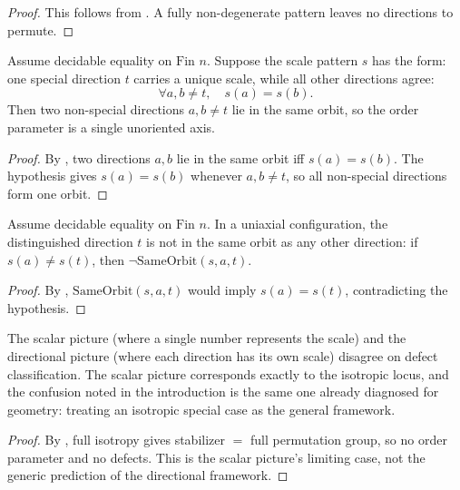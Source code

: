 \begin{proof}
This follows from . A fully non-degenerate pattern leaves no directions to permute.
\end{proof}

\begin{theorem}
Assume decidable equality on $\text{Fin } n$. Suppose the scale pattern $s$ has the form: one special direction $t$ carries a unique scale, while all other directions agree:
\[ \forall a, b \neq t, \quad s(a) = s(b). \]
Then two non-special directions $a, b \neq t$ lie in the same orbit, so the order parameter is a single unoriented axis.
\end{theorem}

\begin{proof}
By , two directions $a, b$ lie in the same orbit iff $s(a) = s(b)$. The hypothesis gives $s(a) = s(b)$ whenever $a, b \neq t$, so all non-special directions form one orbit.
\end{proof}

\begin{theorem}
Assume decidable equality on $\text{Fin } n$. In a uniaxial configuration, the distinguished direction $t$ is not in the same orbit as any other direction: if $s(a) \neq s(t)$, then $\neg \mathrm{SameOrbit}(s, a, t)$.
\end{theorem}

\begin{proof}
By , $\mathrm{SameOrbit}(s, a, t)$ would imply $s(a) = s(t)$, contradicting the hypothesis.
\end{proof}

\begin{theorem}
The scalar picture (where a single number represents the scale) and the directional picture (where each direction has its own scale) disagree on defect classification. The scalar picture corresponds exactly to the isotropic locus, and the confusion noted in the introduction is the same one already diagnosed for geometry: treating an isotropic special case as the general framework.
\end{theorem}

\begin{proof}
By , full isotropy gives stabilizer $= $ full permutation group, so no order parameter and no defects. This is the scalar picture's limiting case, not the generic prediction of the directional framework.
\end{proof}

